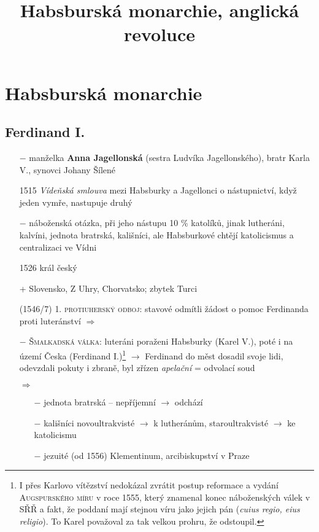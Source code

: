 \documentclass{article}
\title{\vspace{-2cm}Habsburská monarchie, anglická revoluce\vspace{-1.7cm}}
\date{}
\author{}
\begin{document}
\maketitle

\section*{Habsburská monarchie}

\subsection*{Ferdinand I. }
\begin{itemize}
    \vspace{-0.5em}
    \setlength\itemsep{0.15em}
    \item[$-$] manželka \textbf{Anna Jagellonská} (sestra Ludvíka Jagellonského), bratr Karla V., synovci Johany Šílené
    \item[1515] \textit{Vídeňská smlouva} mezi Habsburky a Jagellonci o nástupnictví, když jeden vymře, nastupuje druhý
    \item[$-$] náboženská otázka, při jeho nástupu 10 \% katolíků, jinak lutheráni, kalvíni, jednota bratrská, kališníci, ale Habsburkové chtějí katolicismus a centralizaci ve Vídni
    \item[1526] král český
    \item[+] Slovensko, Z Uhry, Chorvatsko; zbytek Turci
    \item[(1546/7)] \textsc{1. protiuherský odboj}: stavové odmítli žádost o pomoc Ferdinanda proti luteránství $\Rightarrow$
    \item[$-$] \textsc{Šmalkadská válka}: luteráni poraženi Habsburky (Karel V.), poté i na území Česka (Ferdinand I.)\footnote{I přes Karlovo vítězství nedokázal zvrátit postup reformace a vydání \textsc{Augspurského míru} v roce 1555, který znamenal konec náboženských válek v SŘŘ a fakt, že poddaní mají stejnou víru jako jejich pán (\textit{cuius regio, eius religio}). To Karel považoval za tak velkou prohru, že odstoupil.} $\rightarrow$ Ferdinand do měst dosadil svoje lidi, odevzdali pokuty i zbraně, byl zřízen \textit{apelační} = odvolací soud
    \item[$\Rightarrow$] \begin{itemize}
        \vspace{-0.5em}
        \setlength\itemsep{0.15em}
        \item[$-$] jednota bratrská -- nepříjemní $\rightarrow$ odchází
        \item[$-$] kališníci novoultrakvisté $\rightarrow$ k lutheránům, staroultrakvisté $\rightarrow$ ke katolicismu
        \item[$-$] jezuité (od 1556) Klementinum, arcibiskupství v Praze
    \end{itemize}
\end{itemize}
\end{document}

